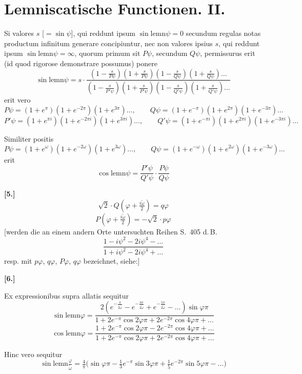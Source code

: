 \documentclass[10pt,a4paper]{article}
\newcommand{\lemn}{\text{lemn}}
\newcommand{\sinlemn}{\sin\lemn}
\newcommand{\coslemn}{\cos\lemn}
\begin{document}
\section*{Lemniscatische Functionen. II.}

Si valores $s$ [$=\sin\psi$], qui reddunt ipsum $\sinlemn\psi = 0$ secundum
regulas notas productum infinitum generare concipiuntur, nec non valores ipsius
$s$, qui reddunt ipsum $\sinlemn\psi = \infty$, quorum primum sit $P\psi$, secundum $Q\psi$,
permissurus erit (id quod rigorose demonstrare possumus) ponere
\[
\sinlemn\psi = s \cdot \frac{(1-\frac{s}{P\psi})(1+\frac{s}{P\psi})(1-\frac{s}{Q\psi})(1+\frac{s}{Q\psi})\ldots}{(1-\frac{s}{P'\psi})(1+\frac{s}{P'\psi})(1-\frac{s}{Q'\psi})(1+\frac{s}{Q'\psi})\ldots}
\]
erit vero
\[
P\psi = (1+e^{\pi})(1+e^{-2\pi})(1+e^{3\pi})\ldots, \qquad
Q\psi = (1+e^{-\pi})(1+e^{2\pi})(1+e^{-3\pi})\ldots
\]
\[
P'\psi = (1+e^{\pi i})(1+e^{-2\pi i})(1+e^{3\pi i})\ldots, \qquad
Q'\psi = (1+e^{-\pi i})(1+e^{2\pi i})(1+e^{-3\pi i})\ldots
\]

Similiter positis
\[
P\psi = (1+e^{\omega})(1+e^{-2\omega})(1+e^{3\omega})\ldots, \qquad
Q\psi = (1+e^{-\omega})(1+e^{2\omega})(1+e^{-3\omega})\ldots
\]
erit
\[
\coslemn\psi = \frac{P'\psi}{Q'\psi} \cdot \frac{P\psi}{Q\psi}
\]

\medskip
\noindent\textbf{[5.]}
\[
\sqrt{2}\cdot Q(\varphi+\tfrac{i\tilde{\omega}}{2}) = q\varphi
\]
\[
P(\varphi+\tfrac{i\tilde{\omega}}{2}) = -\sqrt{2}\cdot p\varphi
\]
[werden die an einem andern Orte untersuchten Reihen S.~405 d.\,B.
\[
\frac{1-i\psi^2-2i\psi^4-\ldots}{1+i\psi^2-2i\psi^4+\ldots}
\]
resp. mit $p\varphi$, $q\varphi$, $P\varphi$, $q\varphi$ bezeichnet, siehe:]

\medskip
\noindent\textbf{[6.]}

Ex expressionibus supra allatis sequitur
\[
\sinlemn\varphi = \frac{2(e^{-\frac{\pi}{2\tilde{\omega}}}-e^{-\frac{3\pi}{2\tilde{\omega}}}+e^{-\frac{5\pi}{2\tilde{\omega}}}-\ldots)\sin\varphi\pi}{1+2e^{-\pi}\cos 2\varphi\pi+2e^{-2\pi}\cos 4\varphi\pi+\ldots}
\]
\[
\coslemn\varphi = \frac{1+2e^{-\pi}\cos 2\varphi\pi-2e^{-2\pi}\cos 4\varphi\pi+\ldots}{1+2e^{-\pi}\cos 2\varphi\pi+2e^{-2\pi}\cos 4\varphi\pi+\ldots}
\]

Hinc vero sequitur
\[
\sinlemn\tfrac{\varphi}{\tilde{\omega}} = \tfrac{4}{\pi}\bigl(\sin\varphi\pi - \tfrac{1}{3}e^{-\pi}\sin 3\varphi\pi + \tfrac{1}{5}e^{-2\pi}\sin 5\varphi\pi - \ldots\bigr)
\]
\end{document}
